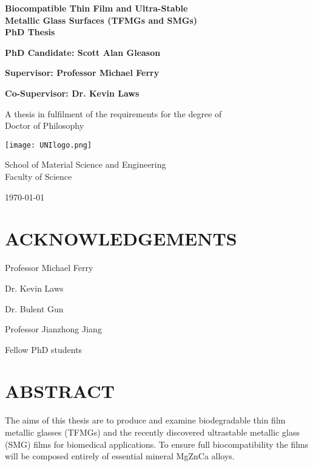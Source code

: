 \documentclass[a4paper,12pt,oneside]{report}%
\begin{document}
\thispagestyle{empty} %
\begin{titlepage}
\begin{center}
\vspace*{1cm}

\textbf{\LARGE{Biocompatible Thin Film and Ultra-Stable\\Metallic Glass Surfaces (TFMGs and SMGs)}}\\
\textbf{PhD Thesis}

\vspace{2cm}

\textbf{\large{PhD Candidate: Scott Alan Gleason}}

\textbf{Supervisor: Professor Michael Ferry}

\textbf{Co-Supervisor: Dr. Kevin Laws}

\vspace{2cm}

A thesis in fulfilment of the requirements for the degree of \\
Doctor of Philosophy

\vspace{1.1cm}

\texttt{[image: UNIlogo.png]}
\label{fig:Unilogo}

\vspace{0.8cm}

School of Material Science and Engineering\\ Faculty of Science

\vspace{2cm}

\today
\end{center}
\end{titlepage}

\clearpage 
{}
\tableofcontents\newpage
\listoffigures\newpage
\listoftables\newpage
\clearpage %

\chapter*{ACKNOWLEDGEMENTS}
Professor Michael Ferry

Dr. Kevin Laws

Dr. Bulent Gun

Professor Jianzhong Jiang

Fellow PhD students

\chapter*{ABSTRACT}
The aims of this thesis are to produce and examine biodegradable thin film metallic glasses (TFMGs) and the recently discovered ultrastable metallic glass (SMG) films for biomedical applications. To ensure full biocompatibility the films will be composed entirely of essential mineral MgZnCa alloys.
\end{document}
